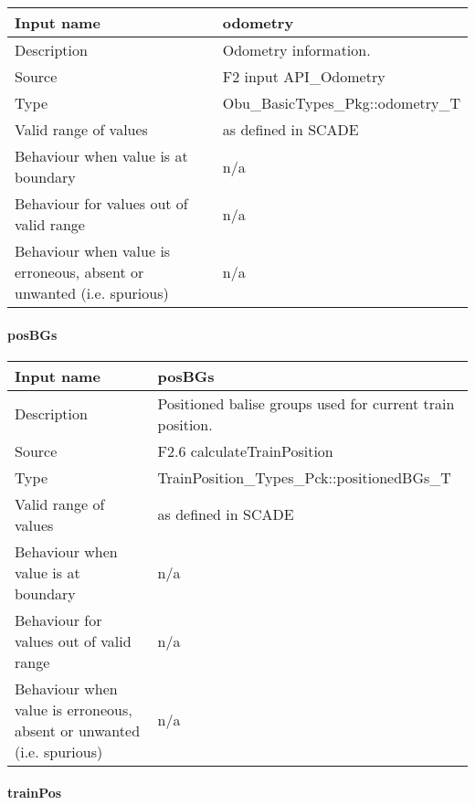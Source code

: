 \begin{longtable}{p{}p{}}
\toprule
Input name				& odometry \\
\midrule
Description				& Odometry information.\\
\midrule
Source					& F2 input API\_Odometry \\ 
\midrule
Type					& Obu\_BasicTypes\_Pkg::odometry\_T \\
\midrule
Valid range of values	& as defined in SCADE \\
\midrule
Behaviour when value is at boundary	& n/a \\
\midrule
Behaviour for values out of valid range	& n/a \\
\midrule
Behaviour when value is erroneous, absent or unwanted (i.e. spurious) & n/a \\
\bottomrule
\end{longtable}

\paragraph{posBGs}

\begin{longtable}{p{}p{}}
\toprule
Input name				& posBGs \\
\midrule
Description				& Positioned balise groups used for current train position. \\
\midrule
Source					& F2.6 calculateTrainPosition \\ 
\midrule
Type					& TrainPosition\_Types\_Pck::positionedBGs\_T \\
\midrule
Valid range of values	& as defined in SCADE \\
\midrule
Behaviour when value is at boundary	& n/a \\
\midrule
Behaviour for values out of valid range	& n/a \\
\midrule
Behaviour when value is erroneous, absent or unwanted (i.e. spurious) & n/a \\
\bottomrule
\end{longtable}

\paragraph{trainPos}

